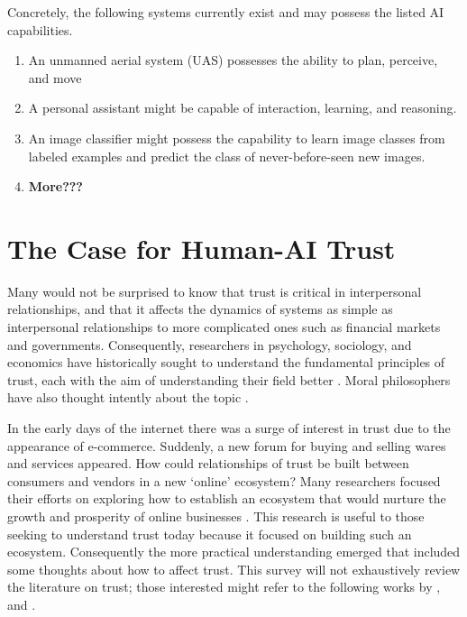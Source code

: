     Concretely, the following systems currently exist and may possess the listed AI capabilities.
    
    \begin{enumerate}
         \item An unmanned aerial system (UAS) possesses the ability to plan, perceive, and move
         \item A personal assistant might be capable of interaction, learning, and reasoning.
         \item An image classifier might possess the capability to learn image classes from labeled examples and predict the class of never-before-seen new images.
         \item \textbf{More???}
     \end{enumerate}

\section{The Case for Human-AI Trust}
    Many would not be surprised to know that trust is critical in interpersonal relationships, and that it affects the dynamics of systems as simple as interpersonal relationships to more complicated ones such as financial markets \cite{Fukuyama1995-un} and governments. Consequently, researchers in psychology, sociology, and economics have historically sought to understand the fundamental principles of trust, each with the aim of understanding their field better \cite{Gambetta1988-pi}. Moral philosophers have also thought intently about the topic \cite{Baier1986-im}.

    In the early days of the internet there was a surge of interest in trust due to the appearance of e-commerce. Suddenly, a new forum for buying and selling wares and services appeared. How could relationships of trust be built between consumers and vendors in a new `online' ecosystem? Many researchers focused their efforts on exploring how to establish an ecosystem that would nurture the growth and prosperity of online businesses \cite{McKnight2001-fa}. This research is useful to those seeking to understand trust today because it focused on building such an ecosystem. Consequently the more practical understanding emerged that included some thoughts about how to affect trust. This survey will not exhaustively review the literature on trust; those interested might refer to the following works by \citet{McKnight2001-fa}, and \citet{Lewicki2006-hj}.

